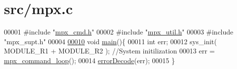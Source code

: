 \hypertarget{mpx_8c_source}{
\section{src/mpx.c}
}

\begin{DoxyCode}
00001 \textcolor{preprocessor}{#include "\hyperlink{mpx__cmd_8h}{mpx_cmd.h}"}
00002 \textcolor{preprocessor}{#include "\hyperlink{mpx__util_8h}{mpx_util.h}"}
00003 \textcolor{preprocessor}{#include "mpx\_supt.h"}
00004 
\hypertarget{mpx_8c_source_l00010}{}\hyperlink{mpx_8c_acdef7a1fd863a6d3770c1268cb06add3}{00010} \textcolor{keywordtype}{void} \hyperlink{mpx_8c_acdef7a1fd863a6d3770c1268cb06add3}{main}()\{
00011         \textcolor{keywordtype}{int} err;
00012         sys\_init( MODULE\_R1 + MODULE\_R2 ); \textcolor{comment}{//System initilization }
00013         err = \hyperlink{mpx__cmd_8c_ab2f64c5ce0432edca230a87739501703}{mpx_command_loop}();
00014         \hyperlink{mpx__util_8c_a849eaf878bb59c0ed185a00d281047e9}{errorDecode}(err);
00015 \}
\end{DoxyCode}

